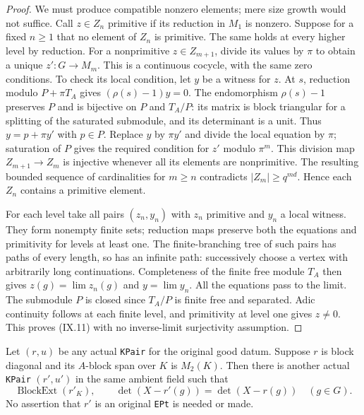 \begin{proof}
We must produce compatible nonzero elements; mere size
growth would not suffice.  Call $z\in Z_n$ primitive
if its reduction in $M_1$ is nonzero.  Suppose for a
fixed $n\ge1$ that no element of $Z_n$ is primitive.
The same holds at every higher level by reduction.
For a nonprimitive $z\in Z_{m+1}$, divide its values
by $\pi$ to obtain a unique $z'\colon G\to M_m$.
This is a continuous cocycle, with the same zero
conditions.  To check its local condition, let $y$
be a witness for $z$.  At $s$, reduction modulo
$P+\pi T_A$ gives $(\rho(s)-1)y=0$.
The endomorphism $\rho(s)-1$ preserves $P$ and is
bijective on $P$ and $T_A/P$: its matrix is block
triangular for a splitting of the saturated submodule,
and its determinant is a unit.  Thus
$y=p+\pi y'$ with $p\in P$.
Replace $y$ by $\pi y'$ and divide the local equation
by $\pi$; saturation of $P$ gives the required condition
for $z'$ modulo $\pi^m$.
This division map $Z_{m+1}\to Z_m$ is injective whenever
all its elements are nonprimitive.
The resulting bounded sequence of cardinalities for
$m\ge n$ contradicts $|Z_m|\ge q^{md}$.
Hence each $Z_n$ contains a primitive element.

For each level take all pairs $(z_n,y_n)$ with $z_n$
primitive and $y_n$ a local witness.  They form nonempty
finite sets; reduction maps preserve both the equations
and primitivity for levels at least one.
The finite-branching tree of such pairs has paths of
every length, so has an infinite path: successively
choose a vertex with arbitrarily long continuations.
Completeness of the finite free module $T_A$ then gives
$z(g)=\lim z_n(g)$ and $y=\lim y_n$.
All the equations pass to the limit.
The submodule $P$ is closed since $T_A/P$ is finite
free and separated.  Adic continuity follows at each
finite level, and primitivity at level one gives
$z\ne0$.  This proves (IX.11) with no inverse-limit
surjectivity assumption.
\end{proof}

\begin{theorem}
\label{claim:IX6}
Let $(r,u)$ be any actual \texttt{KPair} for the original
good datum.  Suppose $r$ is block diagonal and its
$A$-block span over $K$ is $M_2(K)$.  Then there is another
actual \texttt{KPair} $(r',u')$ in the same ambient field
such that
\[
 \operatorname{BlockExt}(r'_K),\qquad
          \det(X-r'(g))=\det(X-r(g))\quad(g\in G).
 \tag{IX.16}
\]
No assertion that $r'$ is an original \texttt{EPt} is
needed or made.
\end{theorem}

